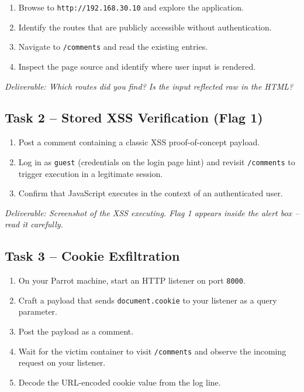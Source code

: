 \documentclass[a4paper, 12pt]{article}
\begin{document}
\begin{enumerate}[leftmargin=2em]
    \item Browse to \texttt{http://192.168.30.10} and explore the application.
    \item Identify the routes that are publicly accessible without authentication.
    \item Navigate to \texttt{/comments} and read the existing entries.
    \item Inspect the page source and identify where user input is rendered.
\end{enumerate}

\textit{Deliverable: Which routes did you find? Is the input reflected raw in the HTML?}

\subsection{Task 2 -- Stored XSS Verification (Flag 1)}

\begin{enumerate}[leftmargin=2em]
    \item Post a comment containing a classic XSS proof-of-concept payload.
    \item Log in as \texttt{guest} (credentials on the login page hint) and revisit
          \texttt{/comments} to trigger execution in a legitimate session.
    \item Confirm that JavaScript executes in the context of an authenticated user.
\end{enumerate}

\textit{Deliverable: Screenshot of the XSS executing. Flag 1 appears inside the
alert box -- read it carefully.}

\subsection{Task 3 -- Cookie Exfiltration}

\begin{enumerate}[leftmargin=2em]
    \item On your Parrot machine, start an HTTP listener on port \texttt{8000}.
    \item Craft a payload that sends \texttt{document.cookie} to your listener as a
          query parameter.
    \item Post the payload as a comment.
    \item Wait for the victim container to visit \texttt{/comments} and observe the
          incoming request on your listener.
    \item Decode the URL-encoded cookie value from the log line.
\end{enumerate}
\end{document}
